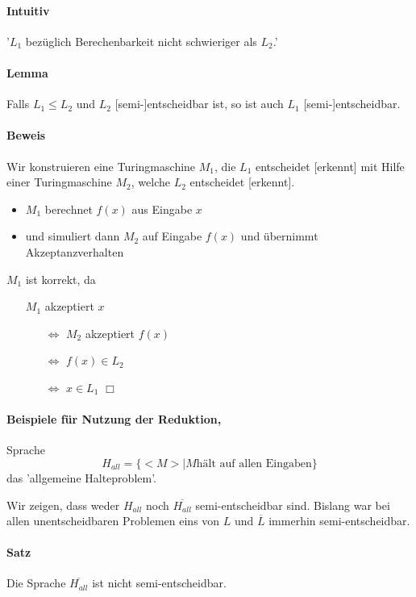 \paragraph*{Intuitiv} '$L_1$ bezüglich Berechenbarkeit nicht schwieriger als $L_2$.'

\paragraph*{Lemma} Falls $L_1 \leq L_2$ und $L_2$ [semi-]entscheidbar ist, so ist auch $L_1$ [semi-]entscheidbar.

\paragraph*{Beweis} Wir konstruieren eine Turingmaschine $M_1$, die $L_1$ entscheidet [erkennt] mit Hilfe einer Turingmaschine $M_2$, welche $L_2$ entscheidet [erkennt].
\begin{itemize}
	\item $M_1$ berechnet $f(x)$ aus Eingabe $x$
	\item und simuliert dann $M_2$ auf Eingabe $f(x)$ und übernimmt Akzeptanzverhalten
\end{itemize}
$M_1$ ist korrekt, da
\begin{itemize}
	\item[] $M_1$ akzeptiert $x$
	\begin{itemize}
		\item[$\Leftrightarrow$] $M_2$ akzeptiert $f(x)$
		\item[$\Leftrightarrow$] $f(x) \in L_2$
		\item[$\Leftrightarrow$] $x \in L_1$ $\Box$
	\end{itemize}
\end{itemize}

\paragraph*{Beispiele für Nutzung der Reduktion,} Sprache $$ H_{all} = \{ <M>|M \text{hält auf allen Eingaben} \} $$ das 'allgemeine Halteproblem'.

\para{} Wir zeigen, dass weder $H_{all}$ noch $\overline{H_{all}}$ semi-entscheidbar sind. Bislang war bei allen unentscheidbaren Problemen eins von $L$ und $\overline{L}$ immerhin semi-entscheidbar.

\paragraph*{Satz} Die Sprache $\overline{H_{all}}$ ist nicht semi-entscheidbar.

